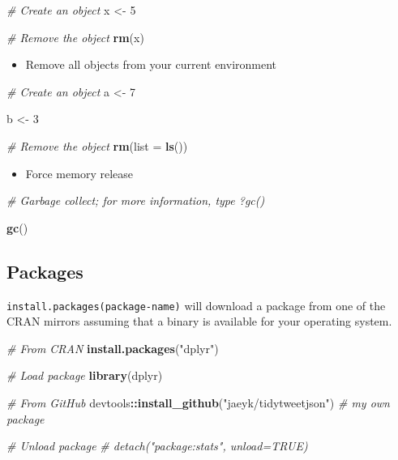 \documentclass[
]{book}
\newenvironment{Shaded}{\begin{snugshade}}{\end{snugshade}}
\newcommand{\CommentTok}[1]{\textcolor[rgb]{0.56,0.35,0.01}{\textit{#1}}}
\newcommand{\DataTypeTok}[1]{\textcolor[rgb]{0.13,0.29,0.53}{#1}}
\newcommand{\DecValTok}[1]{\textcolor[rgb]{0.00,0.00,0.81}{#1}}
\newcommand{\KeywordTok}[1]{\textcolor[rgb]{0.13,0.29,0.53}{\textbf{#1}}}
\newcommand{\NormalTok}[1]{#1}
\newcommand{\OperatorTok}[1]{\textcolor[rgb]{0.81,0.36,0.00}{\textbf{#1}}}
\newcommand{\StringTok}[1]{\textcolor[rgb]{0.31,0.60,0.02}{#1}}
\providecommand{\tightlist}{%
  \setlength{\itemsep}{0pt}\setlength{\parskip}{0pt}}
\begin{document}
\begin{Shaded}
\begin{Highlighting}[]
\CommentTok{\# Create an object }
\NormalTok{x \textless{}{-}}\StringTok{ }\DecValTok{5}

\CommentTok{\# Remove the object }
\KeywordTok{rm}\NormalTok{(x)}
\end{Highlighting}
\end{Shaded}

\begin{itemize}
\tightlist
\item
  Remove all objects from your current environment
\end{itemize}

\begin{Shaded}
\begin{Highlighting}[]
\CommentTok{\# Create an object }
\NormalTok{a \textless{}{-}}\StringTok{ }\DecValTok{7}

\NormalTok{b \textless{}{-}}\StringTok{ }\DecValTok{3}

\CommentTok{\# Remove the object }
\KeywordTok{rm}\NormalTok{(}\DataTypeTok{list =} \KeywordTok{ls}\NormalTok{())}
\end{Highlighting}
\end{Shaded}

\begin{itemize}
\tightlist
\item
  Force memory release
\end{itemize}

\begin{Shaded}
\begin{Highlighting}[]
\CommentTok{\# Garbage collect; for more information, type ?gc() }

\KeywordTok{gc}\NormalTok{()}
\end{Highlighting}
\end{Shaded}

\hypertarget{packages}{%
\subsection{Packages}\label{packages}}

\texttt{install.packages(package-name)} will download a package from one of the CRAN mirrors assuming that a binary is available for your operating system.

\begin{Shaded}
\begin{Highlighting}[]
\CommentTok{\# From CRAN}
\KeywordTok{install.packages}\NormalTok{(}\StringTok{"dplyr"}\NormalTok{) }

\CommentTok{\# Load package }
\KeywordTok{library}\NormalTok{(dplyr)}

\CommentTok{\# From GitHub }
\NormalTok{devtools}\OperatorTok{::}\KeywordTok{install\_github}\NormalTok{(}\StringTok{"jaeyk/tidytweetjson"}\NormalTok{) }\CommentTok{\# my own package }

\CommentTok{\# Unload package }
\CommentTok{\# detach("package:stats", unload=TRUE)}
\end{Highlighting}
\end{Shaded}
\end{document}
